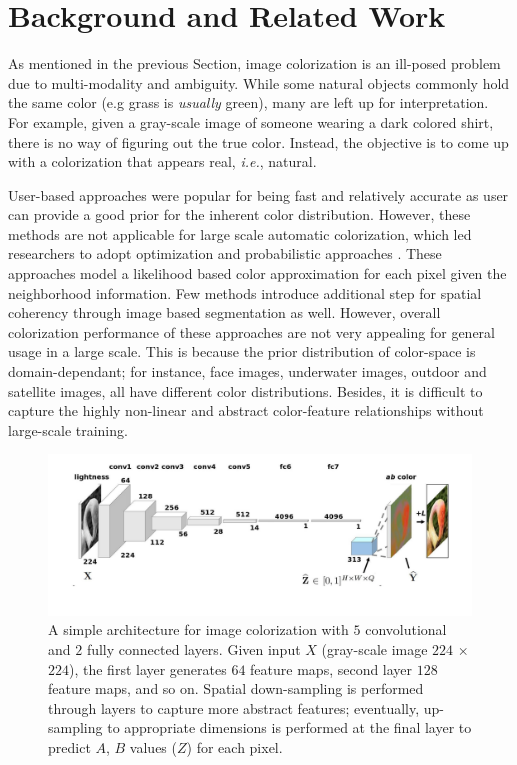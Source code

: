\documentclass[10pt]{article}
\begin{document}
\section{Background and Related Work}\label{sec:back}
As mentioned in the previous Section, image colorization is an ill-posed problem due to multi-modality and ambiguity. 
While some natural objects commonly hold the same color (e.g grass is \textit{usually} green), many are left up for interpretation. 
For example, given a gray-scale image of someone wearing a dark colored shirt, 
there is no way of figuring out the true color. 
Instead, the objective is to come up with a colorization that appears real, \textit{i.e.}, natural. 

User-based approaches \cite{levin2004colorization, konushin2006interactive, reinhard2001color, vrhel1992color} were popular for being fast and relatively accurate as user can provide a good prior for the inherent color distribution. However, these methods are not applicable for large scale automatic colorization, which led researchers to adopt optimization and probabilistic approaches \cite{charpiat2008automatic, bugeau2014variational, lagodzinski2008digital}. 
These approaches model a likelihood based color approximation for each pixel given the neighborhood information. 
Few methods introduce additional step for spatial coherency through image based segmentation as well. However, overall colorization performance of these approaches are not very appealing \cite{deshpande2015learning} for general usage in a large scale. This is because the prior distribution of color-space is domain-dependant; for instance, face images, underwater images, outdoor and satellite images, all have different color distributions. Besides, it is difficult to capture the highly non-linear and abstract color-feature relationships without large-scale training. 

\begin{figure}[h]
\centering
\includegraphics[width=\linewidth]{Figs/7.pdf}
\vspace{-16mm}
\caption{A simple architecture \cite{zhang2016colorful} for image colorization with $5$ convolutional and $2$ fully connected layers. Given input $X$ (gray-scale image $224$ $\times$ $224$), the first layer generates $64$ feature maps, second layer $128$ feature maps, and so on. Spatial down-sampling is performed through layers to capture more abstract features; eventually, up-sampling to appropriate dimensions is performed at the final layer to predict $A$, $B$ values  ($Z$) for each pixel. }
\label{fig:col}
\end{figure} 
\end{document}
